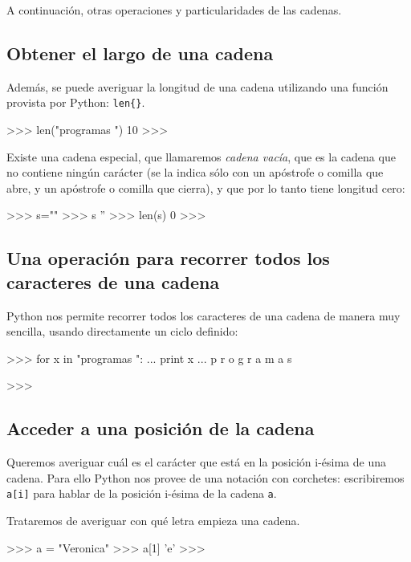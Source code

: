 A continuación, otras operaciones y particularidades de las cadenas.

\subsection{Obtener el largo de una cadena}

Además, se puede averiguar la longitud de una cadena utilizando
una función provista por Python: \lstinline+len{}+.
\begin{codigo-python-sn}
>>> len("programas ")
10
>>>
\end{codigo-python-sn}

Existe una cadena especial, que llamaremos {\it cadena vacía}, que
es la cadena que no contiene ningún carácter (se la indica sólo con
un apóstrofe o comilla que abre, y un apóstrofe o comilla que cierra),
y que por lo tanto tiene longitud cero:

\begin{codigo-python-sn}
>>> s=""
>>> s
''
>>> len(s)
0
>>>
\end{codigo-python-sn}

\subsection[Recorrer una cadena]{Una operación para recorrer todos los caracteres de una cadena}

Python nos permite recorrer todos los caracteres de una cadena de
manera muy sencilla, usando directamente un ciclo definido:

\begin{codigo-python-sn}
>>> for x in "programas ":
...     print x
...
p
r
o
g
r
a
m
a
s

>>>
\end{codigo-python-sn}

\subsection{Acceder a una posición de la cadena}

Queremos averiguar cuál es el carácter que está en la posición i-ésima de
una cadena.  Para ello Python nos provee de una notación con corchetes:
escribiremos \lstinline+a[i]+ para hablar de la posición i-ésima de la cadena
\lstinline!a!.

Trataremos de averiguar con qué letra empieza una cadena.

\begin{codigo-python-sn}
>>> a = "Veronica"
>>> a[1]
'e'
>>>
\end{codigo-python-sn}

